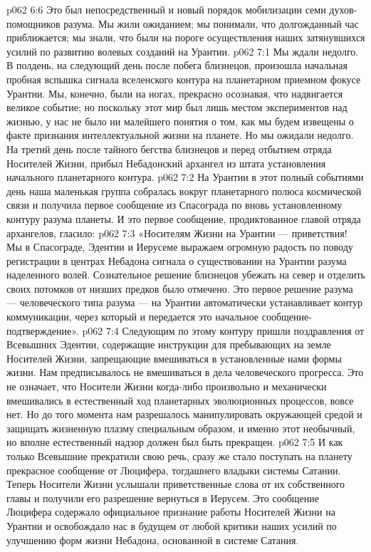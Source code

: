 \vs p062 6:6 Это был непосредственный и новый порядок мобилизации семи духов\hyp{}помощников разума. Мы жили ожиданием; мы понимали, что долгожданный час приближается; мы знали, что были на пороге осуществления наших затянувшихся усилий по развитию волевых созданий на Урантии.
\vs p062 7:1 Мы ждали недолго. В полдень, на следующий день после побега близнецов, произошла начальная пробная вспышка сигнала вселенского контура на планетарном приемном фокусе Урантии. Мы, конечно, были на ногах, прекрасно осознавая, что надвигается великое событие; но поскольку этот мир был лишь местом экспериментов над жизнью, у нас не было ни малейшего понятия о том, как мы будем извещены о факте признания интеллектуальной жизни на планете. Но мы ожидали недолго. На третий день после тайного бегства близнецов и перед отбытием отряда Носителей Жизни, прибыл Небадонский архангел из штата установления начального планетарного контура.
\vs p062 7:2 На Урантии в этот полный событиями день наша маленькая группа собралась вокруг планетарного полюса космической связи и получила первое сообщение из Спасограда по вновь установленному контуру разума планеты. И это первое сообщение, продиктованное главой отряда архангелов, гласило:
\vs p062 7:3 «Носителям Жизни на Урантии --- приветствия! Мы в Спасограде, Эдентии и Иерусеме выражаем огромную радость по поводу регистрации в центрах Небадона сигнала о существовании на Урантии разума наделенного волей. Сознательное решение близнецов убежать на север и отделить своих потомков от низших предков было отмечено. Это первое решение разума --- человеческого типа разума --- на Урантии автоматически устанавливает контур коммуникации, через который и передается это начальное сообщение\hyp{}подтверждение».
\vs p062 7:4 Следующим по этому контуру пришли поздравления от Всевышних Эдентии, содержащие инструкции для пребывающих на земле Носителей Жизни, запрещающие вмешиваться в установленные нами формы жизни. Нам предписывалось не вмешиваться в дела человеческого прогресса. Это не означает, что Носители Жизни когда\hyp{}либо произвольно и механически вмешивались в естественный ход планетарных эволюционных процессов, вовсе нет. Но до того момента нам разрешалось манипулировать окружающей средой и защищать жизненную плазму специальным образом, и именно этот необычный, но вполне естественный надзор должен был быть прекращен.
\vs p062 7:5 И как только Всевышние прекратили свою речь, сразу же стало поступать на планету прекрасное сообщение от Люцифера, тогдашнего владыки системы Сатании. Теперь Носители Жизни услышали приветственные слова от их собственного главы и получили его разрешение вернуться в Иерусем. Это сообщение Люцифера содержало официальное признание работы Носителей Жизни на Урантии и освобождало нас в будущем от любой критики наших усилий по улучшению форм жизни Небадона, основанной в системе Сатания.

